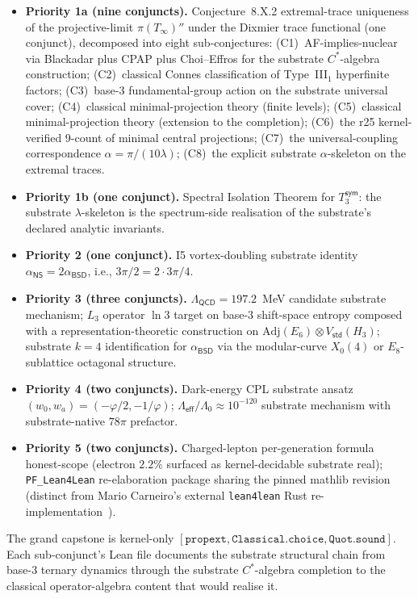 \documentclass[11pt,a4paper]{amsart}
\theoremstyle{plain}
\theoremstyle{definition}
\begin{document}
\begin{itemize}[itemsep=2pt]
\item \textbf{Priority 1a (nine conjuncts).} Conjecture~8.X.2 extremal-trace uniqueness of the projective-limit $\pi(T_\infty)''$ under the Dixmier trace functional (one conjunct), decomposed into eight sub-conjectures: (C1)~AF-implies-nuclear via Blackadar plus CPAP plus Choi--Effros for the substrate $C^*$-algebra construction; (C2)~classical Connes classification of Type~III$_1$ hyperfinite factors; (C3)~base-3 fundamental-group action on the substrate universal cover; (C4)~classical minimal-projection theory (finite levels); (C5)~classical minimal-projection theory (extension to the completion); (C6)~the r25 kernel-verified 9-count of minimal central projections; (C7)~the universal-coupling correspondence $\alpha = \pi/(10\lambda)$; (C8)~the explicit substrate $\alpha$-skeleton on the extremal traces.
\item \textbf{Priority 1b (one conjunct).} Spectral Isolation Theorem for $T_3^{\textsf{sym}}$: the substrate $\lambda$-skeleton is the spectrum-side realisation of the substrate's declared analytic invariants.
\item \textbf{Priority 2 (one conjunct).} I5 vortex-doubling substrate identity $\alpha_{\textsf{NS}} = 2 \alpha_{\textsf{BSD}}$, i.e., $3\pi/2 = 2 \cdot 3\pi/4$.
\item \textbf{Priority 3 (three conjuncts).} $\Lambda_{\textsf{QCD}} = 197.2$~MeV candidate substrate mechanism; $L_3$ operator $\ln 3$ target on base-3 shift-space entropy composed with a representation-theoretic construction on $\mathrm{Adj}(E_6) \otimes V_{\textsf{std}}(H_3)$; substrate $k=4$ identification for $\alpha_{\textsf{BSD}}$ via the modular-curve $X_0(4)$ or $E_8$-sublattice octagonal structure.
\item \textbf{Priority 4 (two conjuncts).} Dark-energy CPL substrate ansatz $(w_0, w_a) = (-\varphi/2, -1/\varphi)$; $\Lambda_{\textsf{eff}}/\Lambda_0 \approx 10^{-120}$ substrate mechanism with substrate-native $78\pi$ prefactor.
\item \textbf{Priority 5 (two conjuncts).} Charged-lepton per-generation formula honest-scope (electron $2.2\%$ surfaced as kernel-decidable substrate real); \texttt{PF\_Lean4Lean} re-elaboration package sharing the pinned mathlib revision (distinct from Mario Carneiro's external \texttt{lean4lean} Rust re-implementation~\cite{carneiro2024}).
\end{itemize}

The grand capstone is kernel-only $[\texttt{propext}, \texttt{Classical.choice}, \texttt{Quot.sound}]$. Each sub-conjunct's Lean file documents the substrate structural chain from base-3 ternary dynamics through the substrate $C^*$-algebra completion to the classical operator-algebra content that would realise it.
\end{document}

